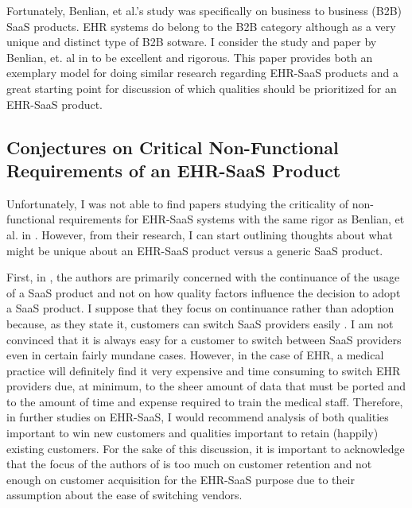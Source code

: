 \documentclass[10pt]{article}
\begin{document}
Fortunately, Benlian, et al.'s study was specifically on business to business (B2B) SaaS products. 
EHR systems do belong to the B2B category although as a very unique and distinct type of B2B sotware.
I consider the study and paper by Benlian, et. al in \cite{saasqual} to be excellent and rigorous.
This paper provides both an exemplary model for doing similar research regarding EHR-SaaS products and a great starting point for discussion of which qualities should be prioritized for an EHR-SaaS product.


\subsection{Conjectures on Critical Non-Functional Requirements of an EHR-SaaS Product}
\label{sec:Critical-EHR-Ilities}

Unfortunately, I was not able to find papers studying the criticality of non-functional requirements for EHR-SaaS systems with the same rigor as Benlian, et al. in \cite{saasqual}.
However, from their research, I can start outlining thoughts about what might be unique about an EHR-SaaS product versus a generic SaaS product.

First, in \cite{saasqual}, the authors are primarily concerned with the continuance of the usage of a SaaS product and not on how quality factors influence the decision to adopt a SaaS product.
I suppose that they focus on continuance rather than adoption because, as they state it, customers can switch SaaS providers easily \cite{saasqual}. 
I am not convinced that it is always easy for a customer to switch between SaaS providers even in certain fairly mundane cases.
However, in the case of EHR, a medical practice will definitely find it very expensive and time consuming to switch EHR providers due, at minimum, to the sheer amount of data that must be ported and to the amount of time and expense required to train the medical staff.
Therefore, in further studies on EHR-SaaS, I would recommend analysis of both qualities important to win new customers and qualities important to retain (happily) existing customers.
For the sake of this discussion, it is important to acknowledge that the focus of the authors of \cite{saasqual} is too much on customer retention and not enough on customer acquisition for the EHR-SaaS purpose due to their assumption about the ease of switching vendors.
\end{document}
